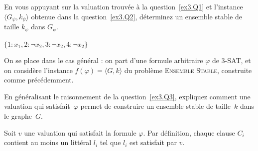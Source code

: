 \begin{exercice}
\begin{corrections}
  \end{corrections}

  \begin{questions}
  \item\label{ex3.Q3} En vous appuyant sur la valuation trouvée à la question~\ref{ex3.Q1}
    et l'instance $\langle G_\psi, k_\psi \rangle$ obtenue dans la question~\ref{ex3.Q2},
    déterminez un ensemble stable de taille $k_\psi$ dans $G_\psi$.
  \end{questions}
  \begin{corrections}
    $\{ 1:x_1, 2:\lnot x_2, 3:\lnot x_2, 4:\lnot x_2\}$
  \end{corrections}

  \ifcorrection{\newpage}
  On se place dans le cas général : on part d'une formule arbitraire $\varphi$ de \textsc{3-SAT}, et on considère l'instance 
  $f(\varphi) = \langle G, k\rangle$ du problème \textsc{Ensemble Stable}, construite comme précédemment.

  \begin{questions}
  \item\label{ex3.Q4} En généralisant le raisonnement de la question~\ref{ex3.Q3},
    expliquez comment une valuation qui satisfait~$\varphi$ permet de construire
    un ensemble stable de taille~$k$ dans le graphe~$G$.
  \end{questions}
  \begin{corrections}
    Soit $v$ une valuation qui satisfait la formule $\varphi$. Par définition, chaque clause $C_i$ contient au moins un littéral $l_i$ tel que $l_i$ est satisfait par $v$.


\end{corrections}
\end{exercice}
